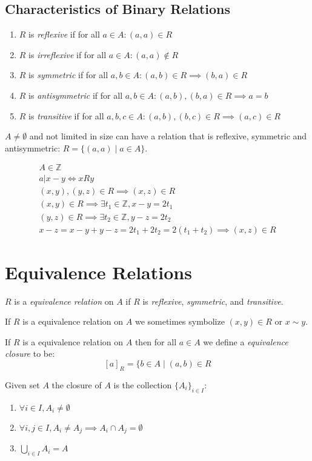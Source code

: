 \documentclass[00_complete]{subfiles}
\begin{document}
\subsection{Characteristics of Binary Relations}
\begin{enumerate} \tightlist
    \item $R$ is \emph{reflexive} if for all $a \in A: (a,a) \in R$
    \item $R$ is \emph{irreflexive} if for all $a \in A: (a,a) \notin R$
    \item $R$ is \emph{symmetric} if for all $a,b \in A: (a,b) \in R \implies (b,a) \in R$
    \item $R$ is \emph{antisymmetric} if for all $a,b \in A: (a,b), (b,a) \in R \implies
   a=b$
    \item $R$ is \emph{transitive} if for all $a,b,c \in A: (a,b), (b,c) \in R \implies
   (a,c) \in R$
\end{enumerate}
$A \neq \emptyset$ and not limited in size can have a relation that is
reflexive, symmetric and antisymmetric: $R =\{(a,a) \mid a \in A \}$.
\begin{example}
\begin{gather*}
    A \in \mathbb{Z} \\
    a|x-y \iff xRy \\
    (x,y), (y,z) \in R \implies (x,z) \in R \\
    (x,y) \in R \implies \exists t_1 \in \mathbb{Z}, x-y=2t_1 \\
    (y,z) \in R \implies \exists t_2 \in \mathbb{Z}, y-z=2t_2 \\
    x-z = x-y + y-z = 2t_1 + 2t_2 = 2(t_1 + t_2) \implies (x,z) \in R
\end{gather*}
\end{example}
\section{Equivalence Relations}
\begin{definition}
$R$ is a \emph{equivalence relation} on $A$ if $R$ is \emph{reflexive}, \emph{symmetric}, and
\emph{transitive}.
\end{definition}

\begin{symbols}
If $R$ is a equivalence relation on $A$ we sometimes symbolize $(x,y) \in R$ or
$x \sim y$.
\end{symbols}

\begin{definition}
If $R$ is a equivalence relation on $A$ then for all $a \in A$ we define a
\emph{equivalence closure} to be:
$$[a]_R = \{b \in A \mid (a,b) \in R$$

Given set $A$ the closure of $A$ is the collection $\{A_i\}_{i \in I}$:
\begin{enumerate}
    \item $\forall i \in I, A_i \neq \emptyset$
    \item $\forall i,j \in I, A_i \neq A_j \implies A_i \cap A_j = \emptyset$
    \item $\displaystyle \bigcup_{i \in I}A_i=A$
\end{enumerate}
\end{definition}
\end{document}
